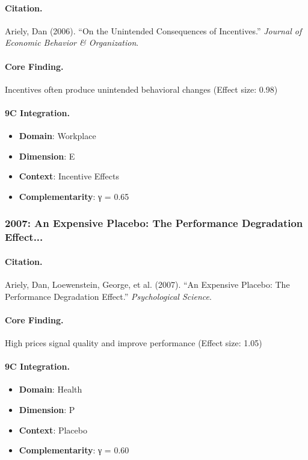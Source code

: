 \paragraph{Citation.}
Ariely, Dan (2006). ``On the Unintended Consequences of Incentives.''
\textit{Journal of Economic Behavior & Organization}.

\paragraph{Core Finding.}
Incentives often produce unintended behavioral changes (Effect size: 0.98)

\paragraph{9C Integration.}
\begin{itemize}[nosep]
  \item \textbf{Domain}: Workplace
  \item \textbf{Dimension}: E
  \item \textbf{Context}: Incentive Effects
  \item \textbf{Complementarity}: γ = 0.65
\end{itemize}

\subsubsection{2007: An Expensive Placebo: The Performance Degradation Effect...}

\paragraph{Citation.}
Ariely, Dan, Loewenstein, George, et al. (2007). ``An Expensive Placebo: The Performance Degradation Effect.''
\textit{Psychological Science}.

\paragraph{Core Finding.}
High prices signal quality and improve performance (Effect size: 1.05)

\paragraph{9C Integration.}
\begin{itemize}[nosep]
  \item \textbf{Domain}: Health
  \item \textbf{Dimension}: P
  \item \textbf{Context}: Placebo
  \item \textbf{Complementarity}: γ = 0.60
\end{itemize}

